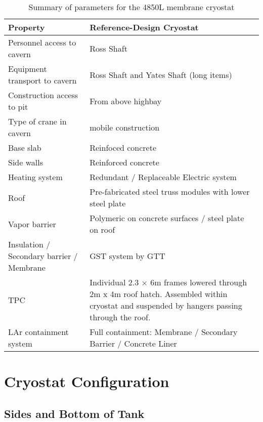 
\begin{table}
\caption{Summary of parameters for the 4850L membrane cryostat} 
\label{table:cryo-reqs}
\begin{tabular}[htbp]{| p{}|p{}|}
\hline 
\textbf{Property} & \textbf{Reference-Design Cryostat}\\
\hline
Personnel access to cavern & Ross Shaft\\
\hline
Equipment transport to cavern & Ross Shaft and Yates Shaft (long items)\\
\hline
Construction access to pit & From above highbay \\
\hline
Type of crane in cavern & mobile construction \\
\hline
Base slab & Reinfoced concrete \\
\hline
Side walls & Reinforced concrete \\
\hline
Heating system & Redundant / Replaceable Electric system \\
\hline
Roof & Pre-fabricated steel truss modules with lower steel plate \\
\hline
Vapor barrier & Polymeric on concrete surfaces / steel plate on roof  \\
\hline
Insulation / Secondary barrier / Membrane & GST system by GTT \\
\hline
TPC & Individual 2.3 $\times$ 6m frames lowered through 2m x 4m roof hatch. Assembled within cryostat and suspended by hangers passing through the roof. \\
\hline
LAr containment system & Full containment: Membrane / Secondary Barrier / Concrete Liner  \\
\hline
\end{tabular} 
\end{table}



\section{Cryostat Configuration}
\label{Sec:cryo-cryosys-cryostat}

\subsection{Sides and Bottom of Tank}

